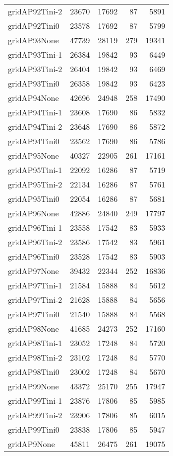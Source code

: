 \begin{longtable}{lrrrr}
gridAP92Tini-2 & 23670 & 17692 & 87 & 5891 \\
gridAP92Tini0 & 23578 & 17692 & 87 & 5799 \\
gridAP93None & 47739 & 28119 & 279 & 19341 \\
gridAP93Tini-1 & 26384 & 19842 & 93 & 6449 \\
gridAP93Tini-2 & 26404 & 19842 & 93 & 6469 \\
gridAP93Tini0 & 26358 & 19842 & 93 & 6423 \\
gridAP94None & 42696 & 24948 & 258 & 17490 \\
gridAP94Tini-1 & 23608 & 17690 & 86 & 5832 \\
gridAP94Tini-2 & 23648 & 17690 & 86 & 5872 \\
gridAP94Tini0 & 23562 & 17690 & 86 & 5786 \\
gridAP95None & 40327 & 22905 & 261 & 17161 \\
gridAP95Tini-1 & 22092 & 16286 & 87 & 5719 \\
gridAP95Tini-2 & 22134 & 16286 & 87 & 5761 \\
gridAP95Tini0 & 22054 & 16286 & 87 & 5681 \\
gridAP96None & 42886 & 24840 & 249 & 17797 \\
gridAP96Tini-1 & 23558 & 17542 & 83 & 5933 \\
gridAP96Tini-2 & 23586 & 17542 & 83 & 5961 \\
gridAP96Tini0 & 23528 & 17542 & 83 & 5903 \\
gridAP97None & 39432 & 22344 & 252 & 16836 \\
gridAP97Tini-1 & 21584 & 15888 & 84 & 5612 \\
gridAP97Tini-2 & 21628 & 15888 & 84 & 5656 \\
gridAP97Tini0 & 21540 & 15888 & 84 & 5568 \\
gridAP98None & 41685 & 24273 & 252 & 17160 \\
gridAP98Tini-1 & 23052 & 17248 & 84 & 5720 \\
gridAP98Tini-2 & 23102 & 17248 & 84 & 5770 \\
gridAP98Tini0 & 23002 & 17248 & 84 & 5670 \\
gridAP99None & 43372 & 25170 & 255 & 17947 \\
gridAP99Tini-1 & 23876 & 17806 & 85 & 5985 \\
gridAP99Tini-2 & 23906 & 17806 & 85 & 6015 \\
gridAP99Tini0 & 23838 & 17806 & 85 & 5947 \\
gridAP9None & 45811 & 26475 & 261 & 19075 \\

\end{longtable}
